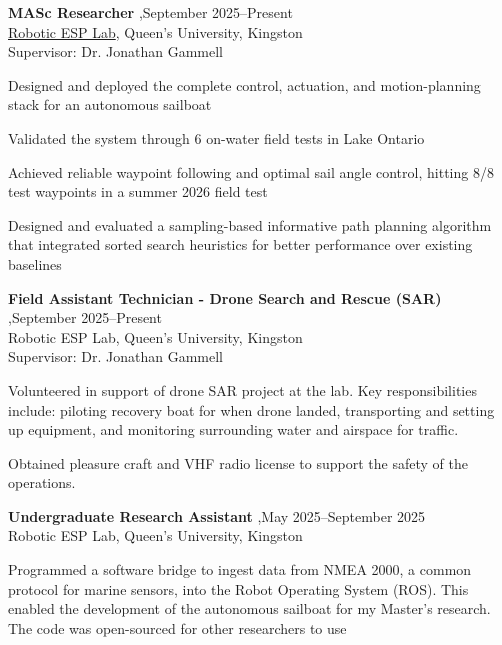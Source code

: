 \documentclass[letterpaper,10pt]{article}
\newenvironment{cvdetails}
  {%
    \begin{list}{\textbullet}{%
      \setlength{\leftmargin}{1.3em}%
      \setlength{\rightmargin}{0pt}%
      \setlength{\labelwidth}{0.6em}%
      \setlength{\labelsep}{0.4em}%
      \setlength{\itemindent}{0pt}%
      \setlength{\listparindent}{0pt}%
      \setlength{\topsep}{3pt}%
      \setlength{\partopsep}{0pt}%
      \setlength{\itemsep}{2pt}%
      \setlength{\parsep}{0pt}%
    }%
  }
  {\end{list}}
\begin{document}
\begin{itemize}

\item
  \textbf{MASc Researcher} \sep September 2025--Present\\
  \href{https://robotic-esp.com/}{Robotic ESP Lab}, Queen's University, Kingston \\
  Supervisor: Dr. Jonathan Gammell

  \begin{cvdetails}
    \item Designed and deployed the complete control, actuation, and motion-planning stack for an autonomous sailboat
    \item Validated the system through 6 on-water field tests in Lake Ontario
    \item Achieved reliable waypoint following and optimal sail angle control, hitting 8/8 test waypoints in a summer 2026 field test
    \item Designed and evaluated a sampling-based informative path planning algorithm that integrated sorted search heuristics for better performance over existing baselines
  \end{cvdetails}

\item
  \textbf{Field Assistant Technician - Drone Search and Rescue (SAR)} \sep September 2025--Present\\
  Robotic ESP Lab, Queen's University, Kingston \\
  Supervisor: Dr. Jonathan Gammell

  \begin{cvdetails}
    \item Volunteered in support of drone SAR project at the lab. Key responsibilities include: piloting recovery boat for when drone landed, transporting and setting up equipment, and monitoring surrounding water and airspace for traffic.
    \item Obtained pleasure craft and VHF radio license to support the safety of the operations.
  \end{cvdetails}

\item
  \textbf{Undergraduate Research Assistant}
  \sep May 2025--September 2025\\
  Robotic ESP Lab, Queen's University, Kingston

  \begin{cvdetails}
    \item Programmed a software bridge to ingest data from NMEA 2000, a common protocol for marine sensors, into the Robot Operating System (ROS). This enabled the development of the autonomous sailboat for my Master's research. The code was open-sourced for other researchers to use
  \end{cvdetails}

\end{itemize}
\end{document}
